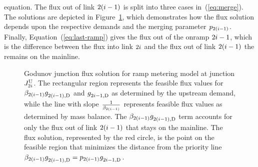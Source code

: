 equation. The flux out of link $2(i-1)$ is split into three cases
in~(\ref{eq:merge}). The solutions are depicted in Figure~\ref{fig:Godunov-junction-flux},
which demonstrates how the flux solution depends upon the respective
demands and the merging parameter $p_{2\left(\link-1\right)}$. Finally,
Equation~(\ref{eq:last-ramp}) gives the flux out of the onramp $2i-1$,
which is the difference between the flux into link $2i$ and the
flux out of link $2\left(\link-1\right)$ the remains on the mainline.
\begin{figure}
\hfill{}\hfill{}

\caption{Godunov junction flux solution for ramp metering model at junction
$J_{2i}^{\text{U}}$. The rectangular region represents the feasible flux
values for $\splitratio_{2\left(\link-1\right)}\fout{2\left(\link-1\right)}{}$
and $g_{2i-1,\text{D}}^{}$ as determined by the upstream demand, while
the line with slope\label{fig:Godunov-junction-flux} $\frac{1}{\splitratio_{2\left(\link-1\right)}}$
represents feasible flux values as determined by mass balance. The
$\splitratio_{2\left(\link-1\right)}\fout{2\left(\link-1\right)}{}$
term accounts for only the flux out of link $2\left(\link-1\right)$
that stays on the mainline. The flux solution, represented by the
red circle, is the point on the feasible region that minimizes the
distance from the priority line $\splitratio_{2\left(\link-1\right)}\fout{2\left(\link-1\right)}{}=p_{2(\link-1)}\fout{2\link-1}{}$.}
\end{figure}


